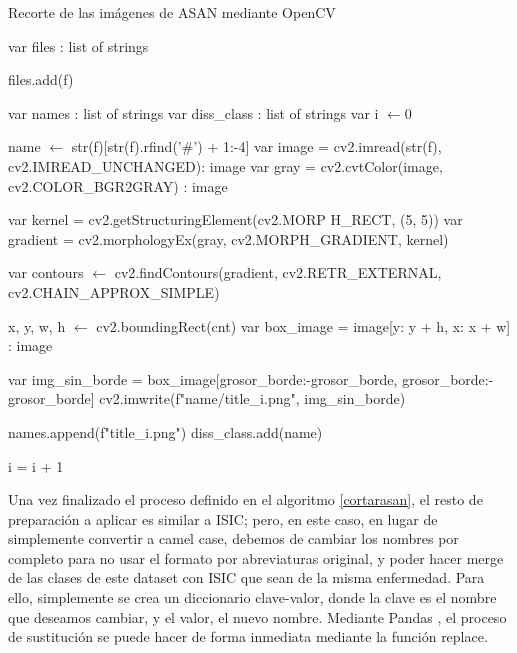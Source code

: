 \begin{algorithm}[H]

		\caption{Recorte de las imágenes de ASAN mediante OpenCV}
		\label{cortarasan}
		\begin{algorithmic}
			\State var files : list of strings
			
			 	 \If {f is\_file()]}
			 	 	\State files.add(f)
			 	 \EndIf
			 \EndFor
			 	 
			\State var names : list of strings
			\State var  diss\_class : list of strings
			 \State var i $\gets 0$
			
				   \State name $\gets$ str(f)[str(f).rfind('\#') + 1:-4]
						\State var image = cv2.imread(str(f), cv2.IMREAD\_UNCHANGED): image
						\State var gray = cv2.cvtColor(image, cv2.COLOR\_BGR2GRAY) : image
			
						\State var kernel = cv2.getStructuringElement(cv2.MORP H\_RECT, (5, 5))
						\State var gradient = cv2.morphologyEx(gray, cv2.MORPH\_GRADIENT, kernel)
			
						\State var contours $\gets$ cv2.findContours(gradient, cv2.RETR\_EXTERNAL, cv2.CHAIN\_APPROX\_SIMPLE)
			
								\State	x, y, w, h  $\gets$ cv2.boundingRect(cnt)
								\State var box\_image = image[y: y + h, x: x + w] : image
				
								\State var img\_sin\_borde = box\_image[grosor\_borde:-grosor\_borde, grosor\_borde:-grosor\_borde]
								\State cv2.imwrite(f"{name}/{title}\_{i}.png", img\_sin\_borde)
					
								\State names.append(f"{title}\_{i}.png")
								\State diss\_class.add(name)
								
								\State i = i + 1
						 \EndFor
				\EndIf	 
	\EndFor
				
\EndProcedure
\end{algorithmic}
\end{algorithm}

Una vez finalizado el proceso definido en el algoritmo \ref{cortarasan}, el resto de preparación a aplicar es similar a ISIC; pero, en este caso, en lugar de simplemente convertir a camel case, debemos de cambiar los nombres por completo para no usar el formato por abreviaturas original, y poder hacer merge de las clases de este dataset con ISIC que sean de la misma enfermedad. Para ello, simplemente se crea un diccionario clave-valor, donde la clave es el nombre que deseamos cambiar, y el valor, el nuevo nombre. Mediante Pandas \cite{reback2020pandas}, el proceso de sustitución se puede hacer de forma inmediata mediante la función replace.

